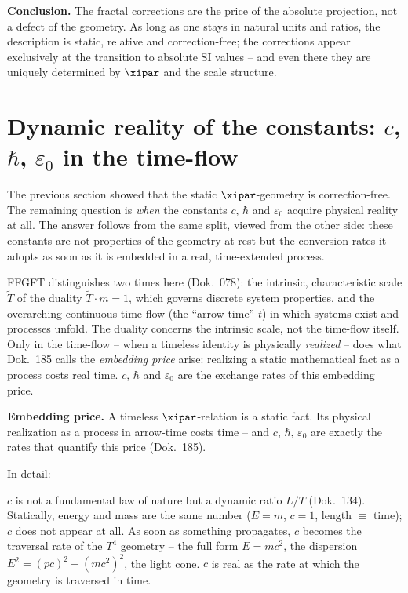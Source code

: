 \begin{result}
\textbf{Conclusion.} The fractal corrections are the price of the absolute
projection, not a defect of the geometry. As long as one stays in natural units
and ratios, the description is static, relative and correction-free; the
corrections appear exclusively at the transition to absolute SI values -- and even
there they are uniquely determined by $\xipar$ and the scale structure.
\end{result}

\section{Dynamic reality of the constants: $c$, $\hbar$, $\varepsilon_0$ in the time-flow}
\label{sec:dyn-konstanten}

The previous section showed that the static $\xipar$-geometry is correction-free.
The remaining question is \emph{when} the constants $c$, $\hbar$ and
$\varepsilon_0$ acquire physical reality at all. The answer follows from the same
split, viewed from the other side: these constants are not properties of the
geometry at rest but the conversion rates it adopts as soon as it is embedded in a
real, time-extended process.

FFGFT distinguishes two times here (Dok.~078): the intrinsic, characteristic scale
$\tilde T$ of the duality $\tilde T\cdot m=1$, which governs discrete system
properties, and the overarching continuous time-flow (the ``arrow time'' $t$) in
which systems exist and processes unfold. The duality concerns the intrinsic
scale, not the time-flow itself. Only in the time-flow -- when a timeless identity
is physically \emph{realized} -- does what Dok.~185 calls the \emph{embedding
price} arise: realizing a static mathematical fact as a process costs real time.
$c$, $\hbar$ and $\varepsilon_0$ are the exchange rates of this embedding price.

\begin{erkenntnis}
\textbf{Embedding price.} A timeless $\xipar$-relation is a static fact. Its
physical realization as a process in arrow-time costs time -- and $c$, $\hbar$,
$\varepsilon_0$ are exactly the rates that quantify this price (Dok.~185).
\end{erkenntnis}

In detail:

\textbf{$c$} is not a fundamental law of nature but a dynamic ratio $L/T$
(Dok.~134). Statically, energy and mass are the same number ($E=m$, $c=1$, length
$\equiv$ time); $c$ does not appear at all. As soon as something propagates, $c$
becomes the traversal rate of the $T^4$ geometry -- the full form $E=mc^2$, the
dispersion $E^2=(pc)^2+(mc^2)^2$, the light cone. $c$ is real as the rate at which
the geometry is traversed in time.

